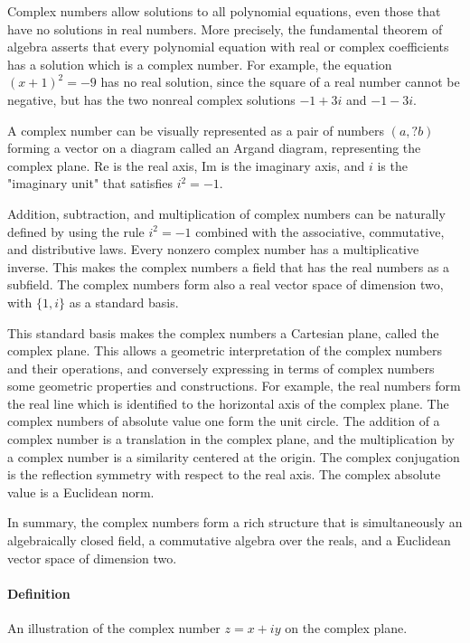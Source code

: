 Complex numbers allow solutions to all polynomial equations, even those that have no solutions in real numbers. More precisely, the fundamental theorem of algebra asserts that every polynomial equation with real or complex coefficients has a solution which is a complex number. For example, the equation $(x + 1)^2 = -9$ has no real solution, since the square of a real number cannot be negative, but has the two nonreal complex solutions $-1 + 3i$ and $-1 - 3i$.

A complex number can be visually represented as a pair of numbers $(a,?b)$ forming a vector on a diagram called an Argand diagram, representing the complex plane. $\text{Re}$ is the real axis, $\text{Im}$ is the imaginary axis, and $i$ is the "imaginary unit" that satisfies $i^2 = -1$.

Addition, subtraction, and multiplication of complex numbers can be naturally defined by using the rule $i^2 = -1$ combined with the associative, commutative, and distributive laws. Every nonzero complex number has a multiplicative inverse. This makes the complex numbers a field that has the real numbers as a subfield. The complex numbers form also a real vector space of dimension two, with $\{1, i\}$ as a standard basis.

This standard basis makes the complex numbers a Cartesian plane, called the complex plane. This allows a geometric interpretation of the complex numbers and their operations, and conversely expressing in terms of complex numbers some geometric properties and constructions. For example, the real numbers form the real line which is identified to the horizontal axis of the complex plane. The complex numbers of absolute value one form the unit circle. The addition of a complex number is a translation in the complex plane, and the multiplication by a complex number is a similarity centered at the origin. The complex conjugation is the reflection symmetry with respect to the real axis. The complex absolute value is a Euclidean norm.

In summary, the complex numbers form a rich structure that is simultaneously an algebraically closed field, a commutative algebra over the reals, and a Euclidean vector space of dimension two.

\paragraph{Definition}

An illustration of the complex number $z = x + iy$ on the complex plane. 

